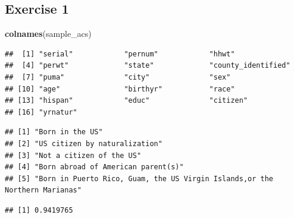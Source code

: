 \documentclass[]{book}
\newenvironment{Shaded}{\begin{snugshade}}{\end{snugshade}}
\newcommand{\KeywordTok}[1]{\textcolor[rgb]{0.13,0.29,0.53}{\textbf{#1}}}
\newcommand{\StringTok}[1]{\textcolor[rgb]{0.31,0.60,0.02}{#1}}
\newcommand{\OperatorTok}[1]{\textcolor[rgb]{0.81,0.36,0.00}{\textbf{#1}}}
\newcommand{\NormalTok}[1]{#1}
\theoremstyle{definition}
\theoremstyle{definition}
\theoremstyle{definition}
\theoremstyle{remark}
\begin{document}
\subsection*{Exercise 1}\label{exercise-1}

\begin{Shaded}
\begin{Highlighting}[]
\KeywordTok{colnames}\NormalTok{(sample_acs)}
\end{Highlighting}
\end{Shaded}

\begin{verbatim}
##  [1] "serial"            "pernum"            "hhwt"             
##  [4] "perwt"             "state"             "county_identified"
##  [7] "puma"              "city"              "sex"              
## [10] "age"               "birthyr"           "race"             
## [13] "hispan"            "educ"              "citizen"          
## [16] "yrnatur"
\end{verbatim}

\begin{Shaded}
\end{Shaded}

\begin{verbatim}
## [1] "Born in the US"                                                           
## [2] "US citizen by naturalization"                                             
## [3] "Not a citizen of the US"                                                  
## [4] "Born abroad of American parent(s)"                                        
## [5] "Born in Puerto Rico, Guam, the US Virgin Islands,or the Northern Marianas"
\end{verbatim}

\begin{Shaded}
\end{Shaded}

\begin{verbatim}
## [1] 0.9419765
\end{verbatim}
\end{document}
